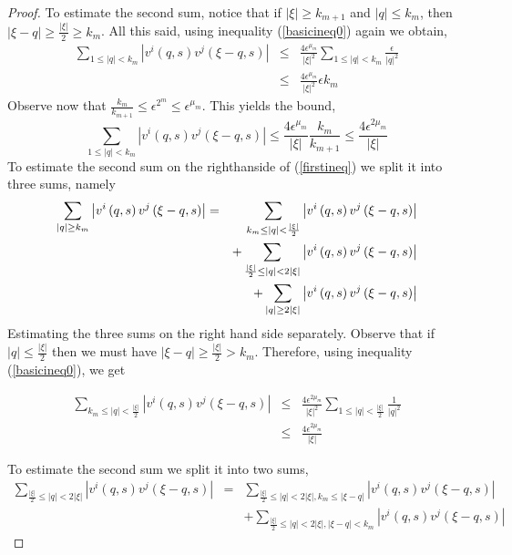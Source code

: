 \documentclass{amsart}
\begin{document}
\begin{proof}
To estimate the second sum, notice 
that if $\left|\xi\right|\geq k_{m+1}$ and $\left|q\right|\leq k_m$, then 
$\left|\xi-q\right|\geq\frac{\left|\xi\right|}{2}\geq k_m$. All this said,
using inequality (\ref{basicineq0}) again we obtain, 
\begin{eqnarray*}
\sum_{1\leq\left|q\right|< k_m}\left|v^i\left(q,s\right)v^j\left(\xi-q,s\right)\right|
&\leq& 
\frac{4\epsilon^{\mu_m}}{\left|\xi\right|^2}\sum_{1\leq\left|q\right|<k_m}\frac{\epsilon}{\left|q\right|^2}\\
&\leq& \frac{4\epsilon^{\mu_m}}{\left|\xi\right|^2}\epsilon k_m
\end{eqnarray*}
Observe now that $\frac{k_m}{k_{m+1}}\leq \epsilon^{2^m}\leq \epsilon^{\mu_m}$. This yields
the bound,
\[
\sum_{1\leq\left|q\right|< k_m}\left|v^i\left(q,s\right)v^j\left(\xi-q,s\right)\right|
\leq  \frac{4\epsilon^{\mu_m}}{\left|\xi\right|}\frac{k_m}{k_{m+1}}
\leq \frac{4\epsilon^{2\mu_m}}{\left|\xi\right|}
\]
To estimate the second sum on the righthanside of (\ref{firstineq}) we split it into three sums, namely
\begin{eqnarray}
\label{firsteq}
\sum_{\left|q\right|\geq k_m}\left|v^i\left(q,s\right)v^j\left(\xi-q,s\right)\right|
&=&\sum_{k_m\leq \left|q\right|<\frac{\left|\xi\right|}{2}}
\left|v^i\left(q,s\right)v^j\left(\xi-q,s\right)\right|\\ \notag
&&
+\sum_{\frac{\left|\xi\right|}{2}\leq \left|q\right|<2\left|\xi\right|}
\left|v^i\left(q,s\right)v^j\left(\xi-q,s\right)\right|\\ \notag
&&
+
\sum_{\left|q\right|\geq 2\left|\xi\right|}
\left|v^i\left(q,s\right)v^j\left(\xi-q,s\right)\right|
\end{eqnarray}
Estimating the three sums on the right hand side separately. Observe that
if $\left|q\right|\leq \frac{\left|\xi\right|}{2}$ then we must have 
$\left|\xi-q\right|\geq \frac{\left|\xi\right|}{2}>k_m$. Therefore, using inequality
(\ref{basicineq0}), we get

\begin{eqnarray*}
\sum_{k_m\leq\left|q\right|<\frac{\left|\xi\right|}{2}}
\left|v^i\left(q,s\right)v^j\left(\xi-q,s\right)\right|&\leq&
\frac{4\epsilon^{2\mu_m}}{\left|\xi\right|^2}\sum_{1\leq\left|q\right|<\frac{\left|\xi\right|}{2}}
\frac{1}{\left|q\right|^2}\\
&\leq& \frac{4\epsilon^{2\mu_m}}{\left|\xi\right|}
\end{eqnarray*}

To estimate the second sum we split it into two sums,
\begin{eqnarray*}
\sum_{\frac{\left|\xi\right|}{2}\leq \left|q\right|<2\left|\xi\right|}
\left|v^i\left(q,s\right)v^j\left(\xi-q,s\right)\right|&=&
\sum_{\frac{\left|\xi\right|}{2}\leq \left|q\right|<2\left|\xi\right|,k_m\leq\left|\xi-q\right|}
\left|v^i\left(q,s\right)v^j\left(\xi-q,s\right)\right|\\
&&+
\sum_{\frac{\left|\xi\right|}{2}\leq \left|q\right|<2\left|\xi\right|,\left|\xi-q\right|<k_m}
\left|v^i\left(q,s\right)v^j\left(\xi-q,s\right)\right|
\end{eqnarray*}


\end{proof}
\end{document}
